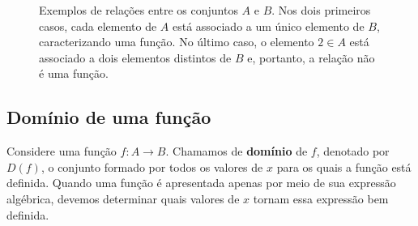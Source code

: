 \begin{figure}[H]
    \caption{Exemplos de relações entre os conjuntos $A$ e $B$. Nos dois primeiros casos, cada elemento de $A$ está associado a um único elemento de $B$, caracterizando uma função. No último caso, o elemento $2\in A$ está associado a dois elementos distintos de $B$ e, portanto, a relação não é uma função.}
    \label{fig:diagramas-funcao}
\end{figure}

\subsection{Domínio de uma função}

Considere uma função $f:A\longrightarrow B$. Chamamos de \textbf{domínio} de $f$, denotado por $D(f)$, o conjunto formado por todos os valores de $x$ para os quais a função está definida. Quando uma função é apresentada apenas por meio de sua expressão algébrica, devemos determinar quais valores de $x$ tornam essa expressão bem definida.

